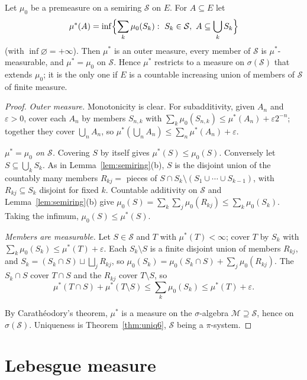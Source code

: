 \begin{theorem}\label{thm:extension}
Let $\mu_0$ be a premeasure on a semiring $\mathcal S$ on $E$. For $A\subseteq E$ let
\[\mu^*(A)=\inf\Bigl\{\sum_k\mu_0(S_k):\ S_k\in\mathcal S,\ A\subseteq\bigcup_kS_k\Bigr\}\]
(with $\inf\varnothing=+\infty$). Then $\mu^*$ is an outer measure, every member of $\mathcal S$ is $\mu^*$-measurable, and $\mu^*=\mu_0$ on $\mathcal S$. Hence $\mu^*$ restricts to a measure on
$\sigma(\mathcal S)$ that extends $\mu_0$; it is the only one if $E$ is a countable increasing union of members of $\mathcal S$ of finite measure.
\end{theorem}
\begin{proof}
\emph{Outer measure.} Monotonicity is clear. For subadditivity, given $A_n$ and $\varepsilon>0$, cover each $A_n$ by members $S_{n,k}$ with $\sum_k\mu_0(S_{n,k})\le\mu^*(A_n)+\varepsilon2^{-n}$; together
they cover $\bigcup_nA_n$, so $\mu^*(\bigcup_nA_n)\le\sum_n\mu^*(A_n)+\varepsilon$.

\emph{$\mu^*=\mu_0$ on $\mathcal S$.} Covering $S$ by itself gives $\mu^*(S)\le\mu_0(S)$. Conversely let $S\subseteq\bigcup_kS_k$. As in Lemma~\ref{lem:semiring}(b), $S$ is the disjoint union of the countably many
members $R_{kj}=$ pieces of $S\cap S_k\setminus(S_1\cup\cdots\cup S_{k-1})$, with $R_{kj}\subseteq S_k$ disjoint for fixed $k$. Countable additivity on $\mathcal S$ and Lemma~\ref{lem:semiring}(b) give
$\mu_0(S)=\sum_k\sum_j\mu_0(R_{kj})\le\sum_k\mu_0(S_k)$. Taking the infimum, $\mu_0(S)\le\mu^*(S)$.

\emph{Members are measurable.} Let $S\in\mathcal S$ and $T$ with $\mu^*(T)<\infty$; cover $T$ by $S_k$ with $\sum_k\mu_0(S_k)\le\mu^*(T)+\varepsilon$. Each $S_k\setminus S$ is a finite disjoint union of members $R_{kj}$,
and $S_k=(S_k\cap S)\sqcup\bigsqcup_jR_{kj}$, so $\mu_0(S_k)=\mu_0(S_k\cap S)+\sum_j\mu_0(R_{kj})$. The $S_k\cap S$ cover $T\cap S$ and the $R_{kj}$ cover $T\setminus S$, so
\[\mu^*(T\cap S)+\mu^*(T\setminus S)\le\sum_k\mu_0(S_k)\le\mu^*(T)+\varepsilon.\]

By Carath\'eodory's theorem, $\mu^*$ is a measure on the $\sigma$-algebra $\mathcal M\supseteq\mathcal S$, hence on $\sigma(\mathcal S)$. Uniqueness is Theorem~\ref{thm:uniq6}, $\mathcal S$ being a $\pi$-system.
\end{proof}

\section{Lebesgue measure}

